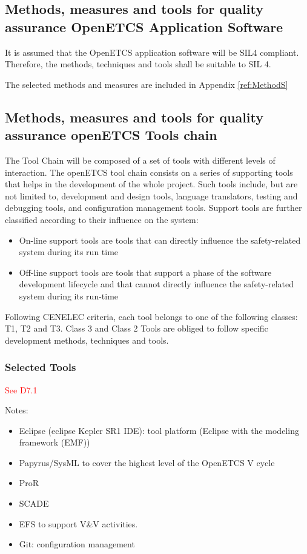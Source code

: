 \documentclass{template/openetcs_article}
\begin{document}
\subsection{Methods, measures and tools for quality assurance OpenETCS Application Software}

It is assumed that the OpenETCS application software will be \gls{SIL}4 compliant. Therefore, the methods, techniques and tools shall be suitable to \gls{SIL} 4. 

The selected methods and measures are included in Appendix  \ref{ref:MethodS}

\subsection{Methods, measures and tools for quality assurance openETCS Tools chain}

The Tool Chain will be composed of a set of tools with different levels of interaction. The openETCS tool chain consists on a series of supporting tools that helps in the development of the whole project. Such tools include, but are not limited to, development and design tools, language translators, testing and debugging tools, and configuration management tools. Support tools are further classified according to their influence on the system:
\begin{itemize}
\item On-line support tools are tools that can directly influence the safety-related system during its run time
\item Off-line support tools are tools that support a phase of the software development lifecycle and that cannot directly influence the safety-related system during its run-time
\end{itemize}

Following CENELEC criteria, each tool belongs to one of the following classes: T1, T2 and T3. Class 3 and Class 2 Tools are obliged to follow specific development methods, techniques and tools. 


\subsubsection{Selected Tools}
\textcolor{red}{See D7.1}

Notes:
\begin{itemize}
\item Eclipse (eclipse Kepler SR1 IDE): tool platform (Eclipse with the modeling framework (EMF))
\item Papyrus/SysML to cover the highest level of the OpenETCS V cycle
\item ProR
\item SCADE
\item EFS to support V\&V activities.
\item Git: configuration management
\end{itemize}
\end{document}
